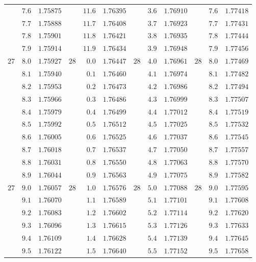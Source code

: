 \begin{center}
{\begin{tabular}{rr|r||rr|r||rr|r||rr|r}
 & $7.6$ & $1.75875$ &  & $11.6$ & $1.76395$ &  & $3.6$ & $1.76910$ &  & $7.6$ & $1.77418$\\
 & $7.7$ & $1.75888$ &  & $11.7$ & $1.76408$ &  & $3.7$ & $1.76923$ &  & $7.7$ & $1.77431$\\
 & $7.8$ & $1.75901$ &  & $11.8$ & $1.76421$ &  & $3.8$ & $1.76935$ &  & $7.8$ & $1.77444$\\
 & $7.9$ & $1.75914$ &  & $11.9$ & $1.76434$ &  & $3.9$ & $1.76948$ &  & $7.9$ & $1.77456$\\[4pt]
$27$ & $8.0$ & $1.75927$ & $28$ & $0.0$ & $1.76447$ & $28$ & $4.0$ & $1.76961$ & $28$ & $8.0$ & $1.77469$\\
 & $8.1$ & $1.75940$ &  & $0.1$ & $1.76460$ &  & $4.1$ & $1.76974$ &  & $8.1$ & $1.77482$\\
 & $8.2$ & $1.75953$ &  & $0.2$ & $1.76473$ &  & $4.2$ & $1.76986$ &  & $8.2$ & $1.77494$\\
 & $8.3$ & $1.75966$ &  & $0.3$ & $1.76486$ &  & $4.3$ & $1.76999$ &  & $8.3$ & $1.77507$\\
 & $8.4$ & $1.75979$ &  & $0.4$ & $1.76499$ &  & $4.4$ & $1.77012$ &  & $8.4$ & $1.77519$\\
 & $8.5$ & $1.75992$ &  & $0.5$ & $1.76512$ &  & $4.5$ & $1.77025$ &  & $8.5$ & $1.77532$\\
 & $8.6$ & $1.76005$ &  & $0.6$ & $1.76525$ &  & $4.6$ & $1.77037$ &  & $8.6$ & $1.77545$\\
 & $8.7$ & $1.76018$ &  & $0.7$ & $1.76537$ &  & $4.7$ & $1.77050$ &  & $8.7$ & $1.77557$\\
 & $8.8$ & $1.76031$ &  & $0.8$ & $1.76550$ &  & $4.8$ & $1.77063$ &  & $8.8$ & $1.77570$\\
 & $8.9$ & $1.76044$ &  & $0.9$ & $1.76563$ &  & $4.9$ & $1.77075$ &  & $8.9$ & $1.77582$\\[4pt]
$27$ & $9.0$ & $1.76057$ & $28$ & $1.0$ & $1.76576$ & $28$ & $5.0$ & $1.77088$ & $28$ & $9.0$ & $1.77595$\\
 & $9.1$ & $1.76070$ &  & $1.1$ & $1.76589$ &  & $5.1$ & $1.77101$ &  & $9.1$ & $1.77608$\\
 & $9.2$ & $1.76083$ &  & $1.2$ & $1.76602$ &  & $5.2$ & $1.77114$ &  & $9.2$ & $1.77620$\\
 & $9.3$ & $1.76096$ &  & $1.3$ & $1.76615$ &  & $5.3$ & $1.77126$ &  & $9.3$ & $1.77633$\\
 & $9.4$ & $1.76109$ &  & $1.4$ & $1.76628$ &  & $5.4$ & $1.77139$ &  & $9.4$ & $1.77645$\\
 & $9.5$ & $1.76122$ &  & $1.5$ & $1.76640$ &  & $5.5$ & $1.77152$ &  & $9.5$ & $1.77658$\\

\end{tabular}}
\end{center}
